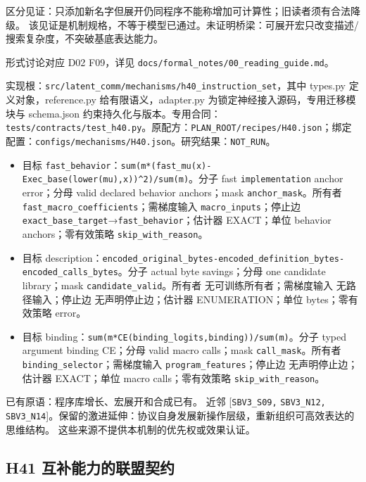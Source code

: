 \documentclass[
  10pt,
]{article}
\begin{document}
区分见证：只添加新名字但展开仍同程序不能称增加可计算性；旧读者须有合法降级。
该见证是机制规格，不等于模型已通过。未证明桥梁：可展开宏只改变描述/搜索复杂度，不突破基底表达能力。

形式讨论对应 D02 F09，详见
{\small\nolinkurl{docs/formal_notes/00_reading_guide.md}}。

实现根：{\small\nolinkurl{src/latent_comm/mechanisms/h40_instruction_set}}，其中
types.py 定义对象，reference.py 给有限语义，adapter.py
为锁定神经接入源码，专用迁移模块与 schema.json
约束持久化与版本。专用合同：{\small\nolinkurl{tests/contracts/test_h40.py}}。原配方：{\small\nolinkurl{PLAN_ROOT/recipes/H40.json}}；绑定配置：{\small\nolinkurl{configs/mechanisms/H40.json}}。研究结果：\nolinkurl{NOT_RUN}。

\begin{itemize}
\item
  目标
  \nolinkurl{fast_behavior}：{\small\nolinkurl{sum(m*(fast_mu(x)-Exec_base(lower(mu),x))^2)/sum(m)}}。分子
  fast \nolinkurl{implementation} anchor error；分母 valid declared
  behavior anchors；mask \nolinkurl{anchor_mask}。所有者
  \nolinkurl{fast_macro_coefficients}；需梯度输入
  \nolinkurl{macro_inputs}；停止边
  \nolinkurl{exact_base_target}→\nolinkurl{fast_behavior}；估计器
  EXACT；单位 behavior anchors；零有效策略
  \nolinkurl{skip_with_reason}。
\item
  目标
  description：{\small\nolinkurl{encoded_original_bytes-encoded_definition_bytes-encoded_calls_bytes}}。分子
  actual byte savings；分母 one candidate library；mask
  \nolinkurl{candidate_valid}。所有者 无可训练所有者；需梯度输入
  无路径输入；停止边 无声明停止边；估计器 ENUMERATION；单位
  bytes；零有效策略 error。
\item
  目标
  binding：{\small\nolinkurl{sum(m*CE(binding_logits,binding))/sum(m)}}。分子
  typed argument binding CE；分母 valid macro calls；mask
  \nolinkurl{call_mask}。所有者 \nolinkurl{binding_selector}；需梯度输入
  \nolinkurl{program_features}；停止边 无声明停止边；估计器 EXACT；单位
  macro calls；零有效策略 \nolinkurl{skip_with_reason}。
\end{itemize}

已有原语：程序库增长、宏展开和合成已有。 近邻 {[}\nolinkurl{SBV3_S09,}
\nolinkurl{SBV3_N12,}
\nolinkurl{SBV3_N14}{]}。保留的激进延伸：协议自身发展新操作层级，重新组织可高效表达的思维结构。
这些来源不提供本机制的优先权或效果认证。

\subsection{H41
互补能力的联盟契约}\label{h41-ux4e92ux8865ux80fdux529bux7684ux8054ux76dfux5951ux7ea6}
\end{document}
